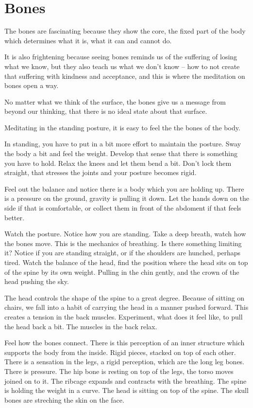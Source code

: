\hypertarget{bones-1}{%
\chapter{Bones}\label{bones-1}}

The bones are fascinating because they show the core, the fixed part of
the body which determines what it is, what it can and cannot do.

It is also frightening because seeing bones reminds us of the suffering
of losing what we know, but they also teach us what we don't know -- how
to not create that suffering with kindness and acceptance, and this is
where the meditation on bones open a way.

No matter what we think of the surface, the bones give us a message from
beyond our thinking, that there is no ideal state about that surface.

Meditating in the standing posture, it is easy to feel the the bones of
the body.

In standing, you have to put in a bit more effort to maintain the
posture. Sway the body a bit and feel the weight. Develop that sense
that there is something you have to hold. Relax the knees and let them
bend a bit. Don't lock them straight, that stresses the joints and your
posture becomes rigid.

Feel out the balance and notice there is a body which you are holding
up. There is a pressure on the ground, gravity is pulling it down. Let
the hands down on the side if that is comfortable, or collect them in
front of the abdoment if that feels better.

Watch the posture. Notice how you are standing. Take a deep breath,
watch how the bones move. This is the mechanics of breathing. Is there
something limiting it? Notice if you are standing straight, or if the
shoulders are hunched, perhaps tired. Watch the balance of the head,
find the position where the head sits on top of the spine by its own
weight. Pulling in the chin gently, and the crown of the head pushing
the sky.

The head controls the shape of the spine to a great degree. Because of
sitting on chairs, we fall into a habit of carrying the head in a manner
pushed forward. This creates a tension in the back muscles. Experiment,
what does it feel like, to pull the head back a bit. The muscles in the
back relax.

Feel how the bones connect. There is this perception of an inner
structure which supports the body from the inside. Rigid pieces, stacked
on top of each other. There is a sensation in the legs, a rigid
perception, which are the long leg bones. There is pressure. The hip
bone is resting on top of the legs, the torso moves joined on to it. The
ribcage expands and contracts with the breathing. The spine is holding
the weight in a curve. The head is sitting on top of the spine. The
skull bones are streching the skin on the face.

